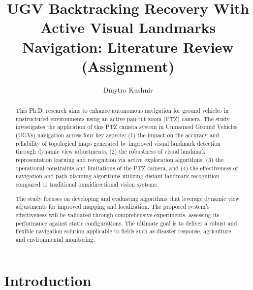 \documentclass[runningheads]{llncs}
\begin{document}
%
\title{
UGV Backtracking Recovery With Active Visual Landmarks Navigation:
Literature Review (Assignment)
}
%
%

\author{Dmytro Kushnir }
%
%
%
\maketitle              %
%
\begin{abstract}
This Ph.D. research aims to enhance autonomous navigation for ground vehicles in unstructured environments using an active pan-tilt-zoom (PTZ) camera. The study investigates the application of this PTZ camera system in Unmanned Ground Vehicles (UGVs) navigation across four key aspects: (1) the impact on the accuracy and reliability of topological maps generated by improved visual landmark detection through dynamic view adjustments, (2) the robustness of visual landmark representation learning and recognition via active exploration algorithms, (3) the operational constraints and limitations of the PTZ camera, and (4) the effectiveness of navigation and path planning algorithms utilizing distant landmark recognition compared to traditional omnidirectional vision systems.

The study focuses on developing and evaluating algorithms that leverage dynamic view adjustments for improved mapping and localization. The proposed system's effectiveness will be validated through comprehensive experiments, assessing its performance against static configurations. The ultimate goal is to deliver a robust and flexible navigation solution applicable to fields such as disaster response, agriculture, and environmental monitoring.


\end{abstract}


\section{Introduction}
\end{document}
